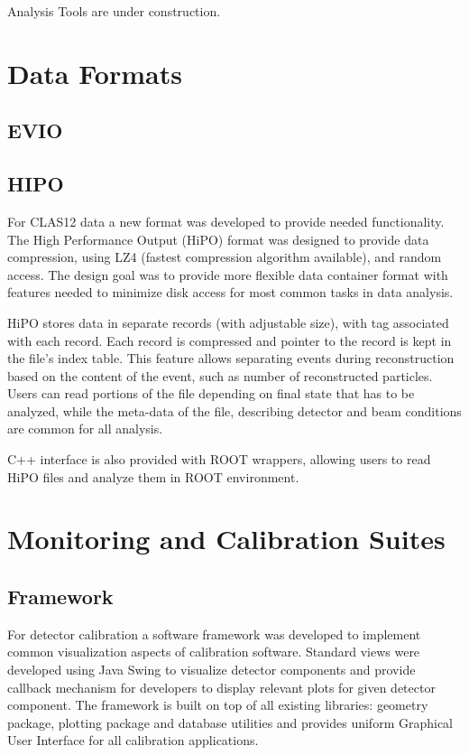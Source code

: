 \documentclass{elsart}
\begin{document}
Analysis Tools are under construction.

\section{Data Formats}

\subsection{EVIO}

\subsection{HIPO}

For CLAS12 data a new format was developed to provide needed functionality. The High Performance Output (HiPO)
format was designed to provide data compression, using LZ4 (fastest compression algorithm available), and random
access. The design goal was to provide more flexible data container format with features needed to minimize disk
access for most common tasks in data analysis.

HiPO stores data in separate records (with adjustable size), with tag associated with each record. Each record is
compressed and pointer to the record is kept in the file's index table. This feature allows separating events during
reconstruction based on the content of the event, such as number of reconstructed particles. Users can read portions
of the file depending on final state that has to be analyzed, while the meta-data of the file, describing detector and
beam conditions are common for all analysis.

C++ interface is also provided with ROOT wrappers, allowing users to read HiPO files and analyze them in ROOT
environment.

\section{Monitoring and Calibration Suites}

\subsection{Framework}

For detector calibration a software framework was developed to implement common visualization aspects of calibration
software. Standard views were developed using Java Swing to visualize detector components and provide callback
mechanism for developers to display relevant plots for given detector component. The framework is built on top of all
existing libraries: geometry package, plotting package and database utilities and provides uniform Graphical User
Interface for all calibration applications.
\end{document}
